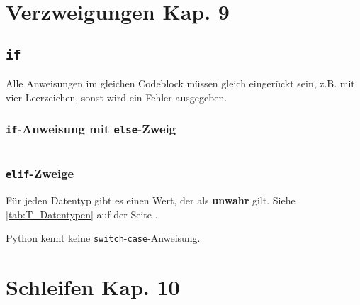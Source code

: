 \section[Verzweigungen]{Verzweigungen \tiny{Kap. 9}}
\subsection{\texttt{if}}

\begin{achtung}
	Alle Anweisungen im gleichen Codeblock müssen gleich eingerückt sein, z.B. mit vier Leerzeichen, sonst wird ein Fehler ausgegeben.
\end{achtung}

\begin{minipage}[t]{0.59\textwidth}
	\subsubsection{\texttt{if}-Anweisung mit \texttt{else}-Zweig}
	
\end{minipage} 
\begin{minipage}[t]{0.02\textwidth} $ \quad $\end{minipage}
\begin{minipage}[t]{0.39\textwidth}
	
	\subsubsection{\texttt{elif}-Zweige}
	
\end{minipage}
$ \quad $\\[8pt]
Für jeden Datentyp gibt es einen Wert, der als \textbf{unwahr} gilt. Siehe \autoref{tab:T_Datentypen} auf der Seite \pageref{tab:T_Datentypen}.

\begin{achtung}
	Python kennt keine \texttt{switch}-\texttt{case}-Anweisung.
\end{achtung}

\section[Schleifen]{Schleifen \tiny{Kap. 10}}

